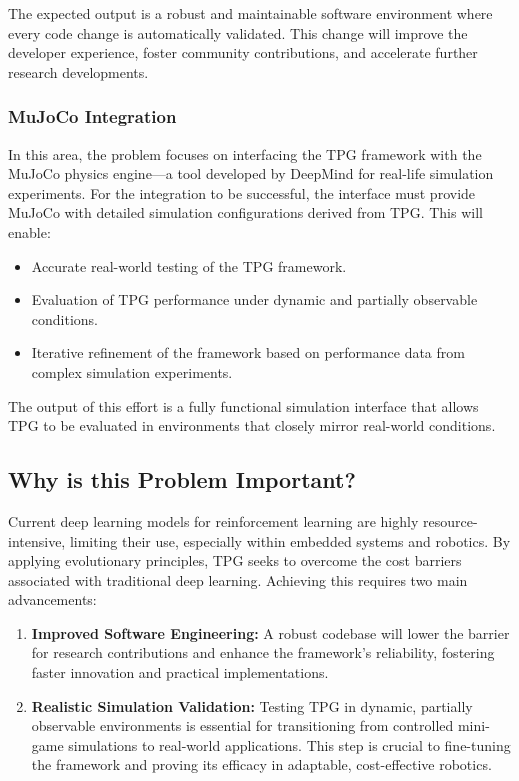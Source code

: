 \documentclass{article}
\begin{document}
The expected output is a robust and maintainable software environment where every code change is automatically validated. This change will improve the developer experience, foster community contributions, and accelerate further research developments.

\subsubsection{MuJoCo Integration}

In this area, the problem focuses on interfacing the TPG framework with the MuJoCo physics engine—a tool developed by DeepMind for real-life simulation experiments. For the integration to be successful, the interface must provide MuJoCo with detailed simulation configurations derived from TPG. This will enable:

\begin{itemize}
  \item Accurate real-world testing of the TPG framework.
  \item Evaluation of TPG performance under dynamic and partially observable conditions.
  \item Iterative refinement of the framework based on performance data from complex simulation experiments.
\end{itemize}

The output of this effort is a fully functional simulation interface that allows TPG to be evaluated in environments that closely mirror real-world conditions.

\subsection{Why is this Problem Important?}

Current deep learning models for reinforcement learning are highly resource-intensive, limiting their use, especially within embedded systems and robotics. By applying evolutionary principles, TPG seeks to overcome the cost barriers associated with traditional deep learning. Achieving this requires two main advancements:

\begin{enumerate}
  \item \textbf{Improved Software Engineering:}  
      A robust codebase will lower the barrier for research contributions and enhance the framework's reliability, fostering faster innovation and practical implementations.
      
  \item \textbf{Realistic Simulation Validation:}  
      Testing TPG in dynamic, partially observable environments is essential for transitioning from controlled mini-game simulations to real-world applications. This step is crucial to fine-tuning the framework and proving its efficacy in adaptable, cost-effective robotics.
\end{enumerate}
\end{document}
